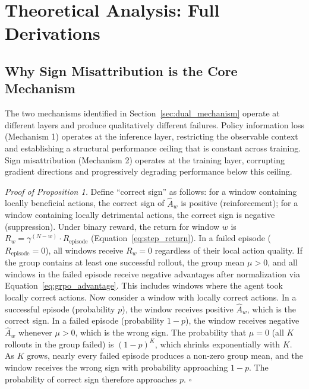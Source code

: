 \appendix

\section{Theoretical Analysis: Full Derivations}
\label{app:theory_full}

\subsection{Why Sign Misattribution is the Core Mechanism}
\label{app:sign_fundamental}

The two mechanisms identified in Section~\ref{sec:dual_mechanism} operate at different layers and produce qualitatively different failures. Policy information loss (Mechanism 1) operates at the inference layer, restricting the observable context and establishing a structural performance ceiling that is constant across training. Sign misattribution (Mechanism 2) operates at the training layer, corrupting gradient directions and progressively degrading performance below this ceiling.

\textit{Proof of Proposition 1.} Define ``correct sign'' as follows: for a window containing locally beneficial actions, the correct sign of $\hat{A}_w$ is positive (reinforcement); for a window containing locally detrimental actions, the correct sign is negative (suppression). Under binary reward, the return for window $w$ is $R_w = \gamma^{(N-w)} \cdot R_{\text{episode}}$ (Equation~\ref{eq:step_return}). In a failed episode ($R_{\text{episode}} = 0$), all windows receive $R_w = 0$ regardless of their local action quality. If the group contains at least one successful rollout, the group mean $\mu > 0$, and all windows in the failed episode receive negative advantages after normalization via Equation~\ref{eq:grpo_advantage}. This includes windows where the agent took locally correct actions. Now consider a window with locally correct actions. In a successful episode (probability $p$), the window receives positive $\hat{A}_w$, which is the correct sign. In a failed episode (probability $1 - p$), the window receives negative $\hat{A}_w$ whenever $\mu > 0$, which is the wrong sign. The probability that $\mu = 0$ (all $K$ rollouts in the group failed) is $(1-p)^K$, which shrinks exponentially with $K$. As $K$ grows, nearly every failed episode produces a non-zero group mean, and the window receives the wrong sign with probability approaching $1-p$. The probability of correct sign therefore approaches $p$. \hfill$\square$

